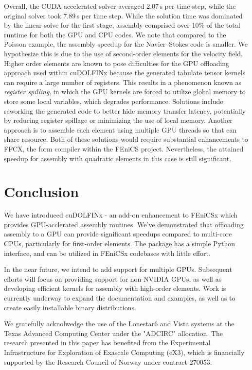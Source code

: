Overall, the CUDA-accelerated solver averaged 2.07\,s per time step, while the original solver took 7.89\,s per time step. While the solution time was dominated by the linear solve for the first stage, assembly comprised over 10\% of the total runtime for both the GPU and CPU codes. We note that compared to the Poisson example, the assembly speedup for the Navier--Stokes code is smaller. We hypothesize this is due to the use of second-order elements for the velocity field. Higher order elements are known to pose difficulties for the GPU offloading approach used within cuDOLFINx because the generated tabulate tensor kernels can require a large number of registers. This results in a phenomenon known as \textit{register spilling}, in which the GPU kernels are forced to utilize global memory to store some local variables, which degrades performance. Solutions include reworking the generated code to better hide memory transfer latency, potentially by reducing register spillage or minimizing the use of local memory. Another approach is to assemble each element using multiple GPU threads so that can share resource. Both of these solutions would require substantial enhancements to FFCX, the form compiler within the FEniCS project. Nevertheless, the attained speedup for assembly with quadratic elements in this case is still significant.

\section*{Conclusion}

We have introduced cuDOLFINx - an add-on enhancement to FEniCSx which provides GPU-acclerated assembly routines. We've demonstrated that offloading assembly to a GPU can provide significant speedups compared to multi-core CPUs, particularly for first-order elements. The package has a simple Python interface, and can be utilized in FEniCSx codebases with little effort.

In the near future, we intend to add support for multiple GPUs. Subsequent efforts will focus on providing support for non-NVIDIA GPUs, as well as developing efficient kernels for assembly with high-order elements. Work is currently underway to expand the documentation and examples, as well as to create easily installable binary distributions.



\begin{acknowledgement}
  We gratefully acknolwedge the use of the Lonestar6 and Vista systems at the Texas Advanced Computing Center under the "ADCIRC" allocation.
The research presented in this paper has benefited from the Experimental Infrastructure for Exploration of Exascale Computing (eX3), which is financially supported by the Research Council of Norway under contract 270053.
\end{acknowledgement}



